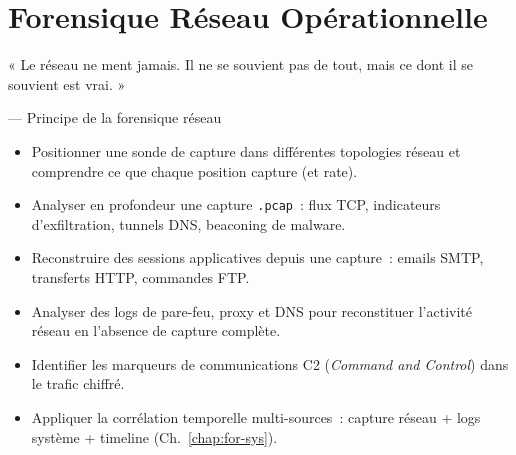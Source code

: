 
\chapter{Forensique Réseau Opérationnelle}
\label{chap:for-res}

\epigraph{%
    « Le réseau ne ment jamais. Il ne se souvient pas de tout,
    mais ce dont il se souvient est vrai. »%
}{--- Principe de la forensique réseau}


\begin{boxobjectifs}
\begin{itemize}
    \item Positionner une sonde de capture dans différentes topologies
          réseau et comprendre ce que chaque position capture (et rate).
    \item Analyser en profondeur une capture \texttt{.pcap}~:
          flux TCP, indicateurs d'exfiltration, tunnels DNS,
          beaconing de malware.
    \item Reconstruire des sessions applicatives depuis une capture~:
          emails SMTP, transferts HTTP, commandes FTP.
    \item Analyser des logs de pare-feu, proxy et DNS pour reconstituer
          l'activité réseau en l'absence de capture complète.
    \item Identifier les marqueurs de communications C2
          (\textit{Command and Control}) dans le trafic chiffré.
    \item Appliquer la corrélation temporelle multi-sources~:
          capture réseau + logs système + timeline (Ch.~\ref{chap:for-sys}).
\end{itemize}
\end{boxobjectifs}


